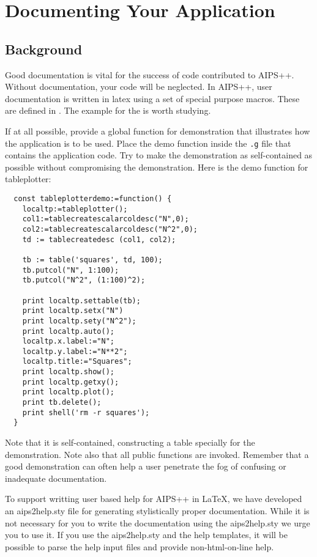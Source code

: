 
\section{Documenting Your Application}
\label{sec:documenting}
\subsection{Background}

Good documentation is vital for the success of code contributed to
AIPS++. Without documentation, your code will be neglected.  In
AIPS++, user documentation is written in latex using a set of special
purpose macros. These are defined in .
The example for the  is worth studying.

If at all possible, provide a global function for demonstration that
illustrates how the application is to be used. Place the demo function
inside the {\tt .g} file that contains the application code.  Try to
make the demonstration as self-contained as possible without
compromising the demonstration. Here is the demo function for
tableplotter:

\begin{verbatim}
  const tableplotterdemo:=function() {
    localtp:=tableplotter();
    col1:=tablecreatescalarcoldesc("N",0);
    col2:=tablecreatescalarcoldesc("N^2",0);
    td := tablecreatedesc (col1, col2);

    tb := table('squares', td, 100);
    tb.putcol("N", 1:100);
    tb.putcol("N^2", (1:100)^2);

    print localtp.settable(tb);
    print localtp.setx("N")
    print localtp.sety("N^2");
    print localtp.auto();
    localtp.x.label:="N";
    localtp.y.label:="N**2";
    localtp.title:="Squares";
    print localtp.show();
    print localtp.getxy();
    print localtp.plot();
    print tb.delete();
    print shell('rm -r squares');
  }
\end{verbatim}

Note that it is self-contained, constructing a table specially for
the demonstration. Note also that all public functions are invoked.
Remember that a good demonstration can often help a user penetrate
the fog of confusing or inadequate documentation.

\newcommand{\userrefman}{
\htmladdnormallink{"AIPS++ User Reference Manual"}{../../user/Refman/Refman.html}}
To support writting user based help for AIPS++ in LaTeX, 
we have developed an aips2help.sty file for generating stylistically proper
documentation.
While it is not necessary for you to write the documentation
using the aips2help.sty we urge you to use it.
If you use the aips2help.sty and the help templates, it will be possible to
parse the help input files and provide non-html-on-line help.

